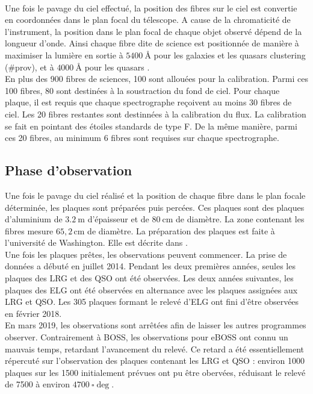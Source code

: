 \documentclass[11pt, twoside, a4paper, openright]{report}
\begin{document}
\paragraph{} Une fois le pavage du ciel effectué, la position des fibres sur le ciel est convertie en coordonnées dans le plan focal du télescope. A cause de la chromaticité de l'instrument, la position dans le plan focal de chaque objet observé dépend de la longueur d'onde. Ainsi chaque fibre dite de science est positionnée de manière à maximiser la lumière en sortie à $\SI{5400}{\angstrom}$ pour les galaxies et les quasars clustering (\#prov), et à $\SI{4000}{\angstrom}$ pour les quasars \lya{}. \\
En plus des \num{900} fibres de sciences, \num{100} sont allouées pour la calibration. Parmi ces \num{100} fibres, \num{80} sont destinées à la soustraction du fond de ciel. Pour chaque plaque, il est requis que chaque spectrographe reçoivent au moins \num{30} fibres de ciel. Les \num{20} fibres restantes sont destinnées à la calibration du flux. La calibration se fait en pointant des étoiles standards de type F. De la même manière, parmi ces \num{20} fibres, au minimum \num{6} fibres sont requises sur chaque spectrographe.


\subsection{Phase d'observation}

Une fois le pavage du ciel réalisé et la position de chaque fibre dans le plan focale déterminée, les plaques sont préparées puis percées. Ces plaques sont des plaques d'aluminium de $\SI{3,2}{\meter}$ d'épaisseur et de $\SI{80}{\centi\meter}$ de diamètre. La zone contenant les fibres mesure $65,2\,\mathrm{cm}$ de diamètre. La préparation des plaques est faite à l'université de Washington. Elle est décrite dans \textcite{Blanton2017}.\\
Une fois les plaques prêtes, les observations peuvent commencer. La prise de données a débuté en juillet 2014. Pendant les deux premières années, seules les plaques des LRG et des QSO ont été observées. Les deux années suivantes, les plaques des ELG ont été observées en alternance avec les plaques assignées aux LRG et QSO. Les \num{305} plaques formant le relevé d'ELG ont fini d'être observées en février 2018. \\
En mars 2019, les observations sont arrêtées afin de laisser les autres programmes observer. Contrairement à BOSS, les observations pour eBOSS ont connu un mauvais temps, retardant l'avancement du relevé. Ce retard a été essentiellement répercuté sur l'observation des plaques contenant les LRG et QSO : environ \num{1000} plaques sur les \num{1500} initialement prévues ont pu être obervées, réduisant le relevé de \num{7500} à environ $\SI{4700}{\square\deg}$.
\end{document}
